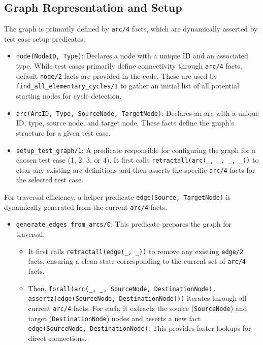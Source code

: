 \documentclass[12pt,a4paper]{article}
\begin{document}
\subsection{Graph Representation and Setup}
The graph is primarily defined by \texttt{arc/4} facts, which are dynamically asserted by test case setup predicates.
\begin{itemize}
\item \texttt{node(NodeID, Type)}: Declares a node with a unique ID and an associated type. While test cases primarily define connectivity through \texttt{arc/4} facts, default \texttt{node/2} facts are provided in the code. These are used by \texttt{find\_all\_elementary\_cycles/1} to gather an initial list of all potential starting nodes for cycle detection.
\item \texttt{arc(ArcID, Type, SourceNode, TargetNode)}: Declares an arc with a unique ID, type, source node, and target node. These facts define the graph's structure for a given test case.
\item \texttt{setup\_test\_graph/1}: A predicate responsible for configuring the graph for a chosen test case (1, 2, 3, or 4). It first calls \texttt{retractall(arc(\_, \_, \_, \_))} to clear any existing arc definitions and then asserts the specific \texttt{arc/4} facts for the selected test case.
\end{itemize}
For traversal efficiency, a helper predicate \texttt{edge(Source, TargetNode)} is dynamically generated from the current \texttt{arc/4} facts.
\begin{itemize}
\item \texttt{generate\_edges\_from\_arcs/0}: This predicate prepares the graph for traversal.
\begin{itemize}
\item It first calls \texttt{retractall(edge(\_, \_))} to remove any existing \texttt{edge/2} facts, ensuring a clean state corresponding to the current set of \texttt{arc/4} facts.
\item Then, \texttt{forall(arc(\_, \_, SourceNode, DestinationNode), assertz(edge(SourceNode, DestinationNode)))} iterates through all current \texttt{arc/4} facts. For each, it extracts the source (\texttt{SourceNode}) and target (\texttt{DestinationNode}) nodes and asserts a new fact \texttt{edge(SourceNode, DestinationNode)}. This provides faster lookups for direct connections.
\end{itemize}
\end{itemize}
\end{document}

